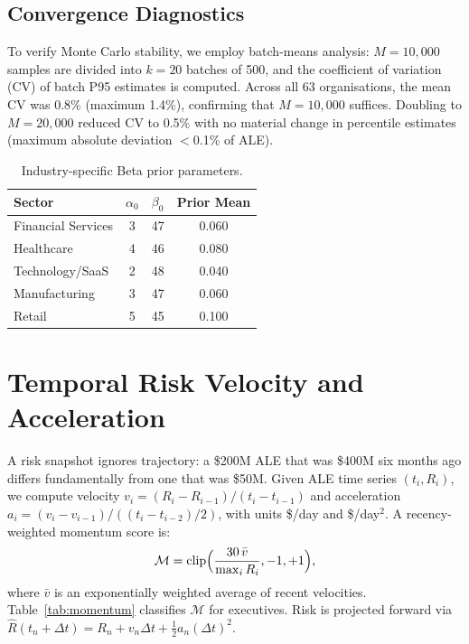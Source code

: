 \documentclass[conference]{IEEEtran}
\begin{document}
\subsection{Convergence Diagnostics}
\label{sec:convergence}
To verify Monte Carlo stability, we employ batch-means analysis: $M{=}10{,}000$ samples are divided into $k{=}20$ batches of 500, and the coefficient of variation (CV) of batch P95 estimates is computed. Across all 63 organisations, the mean CV was 0.8\% (maximum 1.4\%), confirming that $M{=}10{,}000$ suffices. Doubling to $M{=}20{,}000$ reduced CV to 0.5\% with no material change in percentile estimates (maximum absolute deviation $<$0.1\% of ALE).

\begin{table}[h]
  \centering
  \caption{Industry-specific Beta prior parameters.}
  \label{tab:priors}
  \begin{tabular}{lccc}
    \toprule
    Sector & $\alpha_0$ & $\beta_0$ & Prior Mean \\
    \midrule
    Financial Services & 3 & 47 & 0.060 \\
    Healthcare         & 4 & 46 & 0.080 \\
    Technology/SaaS    & 2 & 48 & 0.040 \\
    Manufacturing      & 3 & 47 & 0.060 \\
    Retail             & 5 & 45 & 0.100 \\
    \bottomrule
  \end{tabular}
\end{table}

\section{Temporal Risk Velocity and Acceleration}
\label{sec:trva}

A risk snapshot ignores trajectory: a \$200M ALE that was \$400M six months ago differs fundamentally from one that was \$50M. Given ALE time series $(t_i,R_i)$, we compute velocity $v_i = (R_i - R_{i-1})/(t_i - t_{i-1})$ and acceleration $a_i = (v_i - v_{i-1})/((t_i - t_{i-2})/2)$, with units \$/day and \$/day$^2$. A recency-weighted momentum score is:
\begin{equation}
  \mathcal{M} = \mathrm{clip}\Bigl(\frac{30\,\bar{v}}{\max_i R_i}, -1, +1\Bigr),
  \label{eq:momentum}
\end{equation}
where $\bar{v}$ is an exponentially weighted average of recent velocities. Table~\ref{tab:momentum} classifies $\mathcal{M}$ for executives. Risk is projected forward via $\hat{R}(t_n+\Delta t) = R_n + v_n \Delta t + \tfrac{1}{2} a_n (\Delta t)^2$.
\end{document}
